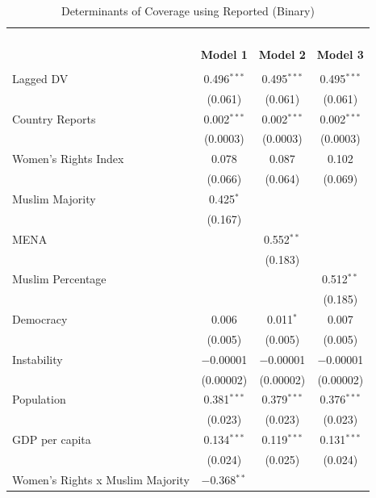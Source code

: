 \documentclass[11pt, oneside]{article}
\begin{document}
\begin{table}[!htbp] \centering 
  \caption{Determinants of Coverage using Reported (Binary)} 
  \label{table:logit} 
\begin{tabular}{@{\extracolsep{5pt}}lccc} 
\\[-1.8ex]\hline \\[-1.8ex] 
\\[-1.8ex] & \multicolumn{3}{c}{\textbf{}} \\ 
\\[-1.8ex] & \textbf{Model 1} & \textbf{Model 2} & \textbf{Model 3}\\ 
\hline \\[-1.8ex] 
 Lagged DV & 0.496$^{***}$ & 0.495$^{***}$ & 0.495$^{***}$ \\ 
  & (0.061) & (0.061) & (0.061) \\ 
  Country Reports & 0.002$^{***}$ & 0.002$^{***}$ & 0.002$^{***}$ \\ 
  & (0.0003) & (0.0003) & (0.0003) \\ 
  Women's Rights Index & 0.078 & 0.087 & 0.102 \\ 
  & (0.066) & (0.064) & (0.069) \\ 
  Muslim Majority & 0.425$^{*}$ &  &  \\ 
  & (0.167) &  &  \\ 
  MENA &  & 0.552$^{**}$ &  \\ 
  &  & (0.183) &  \\ 
  Muslim Percentage &  &  & 0.512$^{**}$ \\ 
  &  &  & (0.185) \\ 
  Democracy & 0.006 & 0.011$^{*}$ & 0.007 \\ 
  & (0.005) & (0.005) & (0.005) \\ 
  Instability & $-$0.00001 & $-$0.00001 & $-$0.00001 \\ 
  & (0.00002) & (0.00002) & (0.00002) \\ 
  Population & 0.381$^{***}$ & 0.379$^{***}$ & 0.376$^{***}$ \\ 
  & (0.023) & (0.023) & (0.023) \\ 
  GDP per capita & 0.134$^{***}$ & 0.119$^{***}$ & 0.131$^{***}$ \\ 
  & (0.024) & (0.025) & (0.024) \\ 
  Women's Rights x Muslim Majority & $-$0.368$^{**}$ &  &  \\ 

\end{tabular}
\end{table}
\end{document}
